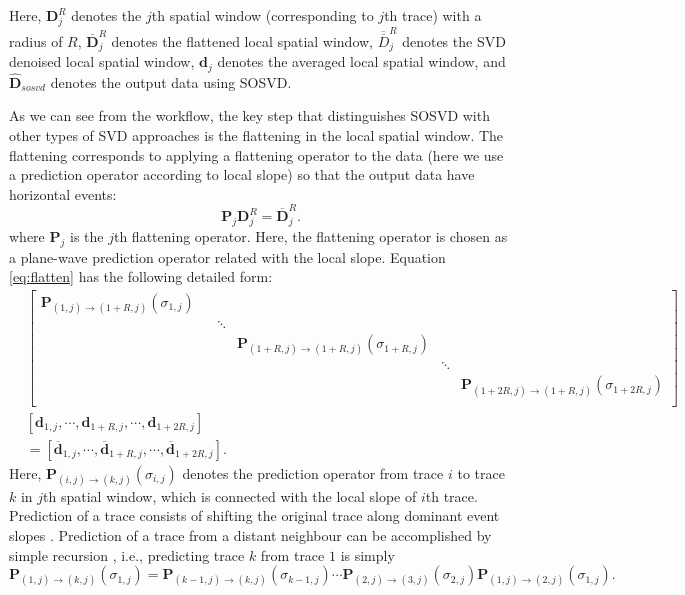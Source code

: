 Here, $\mathbf{D}_j^R$ denotes the $j$th spatial window (corresponding to $j$th trace) with a radius of $R$, $\overline{\mathbf{D}}_j^R$ denotes the flattened local spatial window, $\overline{\overline{D}}_j^R$ denotes the SVD denoised local spatial window, $\mathbf{d}_j$ denotes the averaged local spatial window, and $\hat{\mathbf{D}}_{sosvd}$ denotes the output data using SOSVD.

As we can see from the workflow, the key step that distinguishes SOSVD with other types of SVD approaches is the flattening in the local spatial window. The flattening corresponds to applying a flattening operator to the data (here we use a prediction operator according to local slope) so that the output data have horizontal events:
\begin{equation}
\label{eq:flatten}
 \mathbf{P}_j \mathbf{D}_j^R= \overline{\mathbf{D}}_j^R.
\end{equation}
where $\mathbf{P}_j$ is the $j$th flattening operator. Here, the flattening operator is chosen as a plane-wave prediction operator related with the local slope. 
Equation \ref{eq:flatten} has the following detailed form:
\begin{equation}
\label{eq:detail}
\begin{split}
& \left[
\begin{array}{cccccc}
\mathbf{P}_{(1,j)\rightarrow(1+R,j)}(\sigma_{1,j}) &  & & & & \\
 &  & \ddots & & & \\
 &  & & \mathbf{P}_{(1+R,j)\rightarrow(1+R,j)}(\sigma_{1+R,j}) & & \\
 &  & & & \ddots & \\
 &  & & & & \mathbf{P}_{(1+2R,j)\rightarrow(1+R,j)}(\sigma_{1+2R,j})\\
\end{array}
\right]\\
&[\mathbf{d}_{1,j},\cdots,\mathbf{d}_{1+R,j}, \cdots, \mathbf{d}_{1+2R,j}]\\
&=[\overline{\mathbf{d}}_{1,j},\cdots,\overline{\mathbf{d}}_{1+R,j}, \cdots, \overline{\mathbf{d}}_{1+2R,j}]. 
\end{split}
\end{equation}
Here, $\mathbf{P}_{(i,j)\rightarrow(k,j)}(\sigma_{i,j})$ denotes the prediction operator from trace $i$ to trace $k$ in $j$th spatial window, which is connected with the local slope of $i$th trace.  Prediction of a trace consists of shifting the original trace along dominant event slopes \cite[]{fomel2010painting}.  
Prediction of a trace from a distant neighbour can be accomplished by simple recursion \cite[]{liuyang2010}, i.e., predicting trace $k$ from trace $1$ is simply
\begin{equation}
\label{eq:recur}
\mathbf{P}_{(1,j)\rightarrow(k,j)} (\sigma_{1,j})= \mathbf{P}_{(k-1,j)\rightarrow(k,j)}(\sigma_{k-1,j})\cdots\mathbf{P}_{(2,j)\rightarrow(3,j)}(\sigma_{2,j})\mathbf{P}_{(1,j)\rightarrow(2,j)}(\sigma_{1,j}).
\end{equation}

